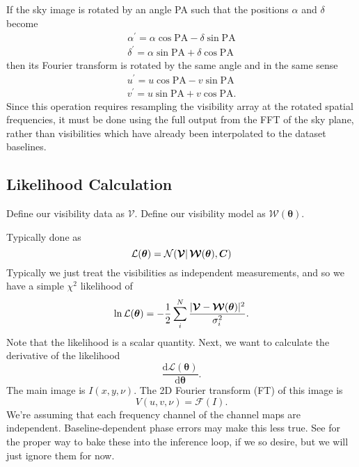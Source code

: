 \documentclass[modern]{aastex62}
\newcommand{\vd}{\boldsymbol{\mathcal{V}}} %
\newcommand{\vm}{\boldsymbol{\mathcal{W}}} %
\newcommand{\btheta}{\boldsymbol{\theta}} %
\begin{document}
If the sky image is rotated by an angle PA such that the positions $\alpha$ and $\delta$ become
\begin{eqnarray}
\alpha^\prime = \alpha \cos \mathrm{PA} - \delta \sin \mathrm{PA} \\
\delta^\prime = \alpha \sin \mathrm{PA} + \delta \cos \mathrm{PA}
\end{eqnarray}
then its Fourier transform is rotated by the same angle and in the same sense \citep{bracewell00}
\begin{eqnarray}
u^\prime = u \cos \mathrm{PA} - v \sin \mathrm{PA} \\
v^\prime = u \sin \mathrm{PA} + v \cos \mathrm{PA}.
\end{eqnarray}
Since this operation requires resampling the visibility array at the rotated spatial frequencies, it must be done using the full output from the FFT of the sky plane, rather than visibilities which have already been interpolated to the dataset baselines.


\subsection{Likelihood Calculation}

Define our visibility data as $\boldsymbol{\mathcal{V}}$.
Define our visibility model as $\boldsymbol{\mathcal{W}}(\boldsymbol{\theta})$.

Typically done as
\begin{equation}
    {\cal L}(\boldsymbol{\theta}) = {\cal N}(\boldsymbol{\mathcal{V}} |\, \boldsymbol{\mathcal{W}}(\boldsymbol{\theta}), \boldsymbol{C})
\end{equation}
Typically we just treat the visibilities as independent measurements, and so we have a simple $\chi^2$ likelihood of
\begin{equation}
    \ln {\cal L}(\btheta) = - \frac{1}{2} \sum_i^N \frac{|\vd - \vm(\btheta)|^2}{\sigma_i^2}.
\end{equation}
Note that the likelihood is a scalar quantity. Next, we want to calculate the derivative of the likelihood
\begin{equation}
    \frac{\mathrm{d}\mathcal{L}(\btheta)}{\mathrm{d}\btheta}.
\end{equation}
The main image is $I(x,y,\nu)$. The 2D Fourier transform (FT) of this image is
\begin{equation}
    V(u,v,\nu) = \mathcal{F}(I).
\end{equation}
We're assuming that each frequency channel of the channel maps are independent. Baseline-dependent phase errors may make this less true. See \citet{hezaveh13} for the proper way to bake these into the inference loop, if we so desire, but we will just ignore them for now.
\end{document}
